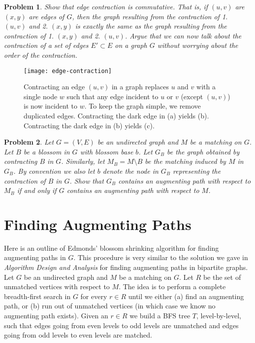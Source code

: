 \documentclass[11pt]{article}
\newtheorem{problem}{Problem}
\begin{document}
\begin{problem}
Show that edge contraction is commutative.  That is, if $(u,v)$ are $(x,y)$ are edges of $G$, then the graph resulting from the contraction of 1. $(u,v)$ and 2. $(x,y)$ is exactly the same as the graph resulting from the contraction of 1. $(x,y)$ and 2. $(u,v)$.  Argue that we can now talk about the contraction of a set of edges $E' \subset E$ on a graph $G$ without worrying about the order of the contraction. 
\end{problem}

\begin{figure}[hbt]
\centering\texttt{[image: edge-contraction]}
\caption{\label{fig:contraction}  Contracting an edge $(u,v)$ in a graph replaces $u$ and $v$ with a single node $w$ such that any edge incident to $u$ or $v$ (except $(u,v)$) is now incident to $w$.  To keep the graph simple, we remove duplicated edges.  Contracting the dark edge in (a) yields (b).  Contracting the dark edge in (b) yields (c). }
\end{figure}

\begin{problem}  \label{problem:augment}
Let $G=(V,E)$ be an undirected graph and $M$ be a matching on $G$.   Let $B$ be a blossom in $G$ with blossom base $b$.  Let $G_{B}$ be the graph obtained by contracting $B$ in $G$.  Similarly, let $M_{B}=M \setminus B$ be the matching induced by $M$ in $G_{B}$.  By convention we also let $b$ denote the node in $G_{B}$ representing the contraction of $B$ in $G$.  Show that $G_{B}$ contains an augmenting path with respect to $M_{B}$ if and only if $G$ contains an augmenting path with respect to $M$.
\end{problem}

\section{Finding Augmenting Paths}

Here is an outline of Edmonds' blossom shrinking algorithm for finding augmenting paths in $G$.  This procedure is very similar to the solution we gave in {\em Algorithm Design and Analysis} for finding augmenting paths in bipartite graphs. Let $G$ be an undirected graph and $M$ be a matching on $G$.  Let $R$ be the set of unmatched vertices with respect to $M$.  The idea is to perform a complete breadth-first search in $G$ for every $r \in R$ until we either (a) find an augmenting path, or (b) run out of unmatched vertices (in which case we know no augmenting path exists).   Given an $r \in R$ we build a BFS tree $T$, level-by-level, such that edges going from even levels to odd levels are unmatched and edges going from odd levels to even levels are matched.
\end{document}
